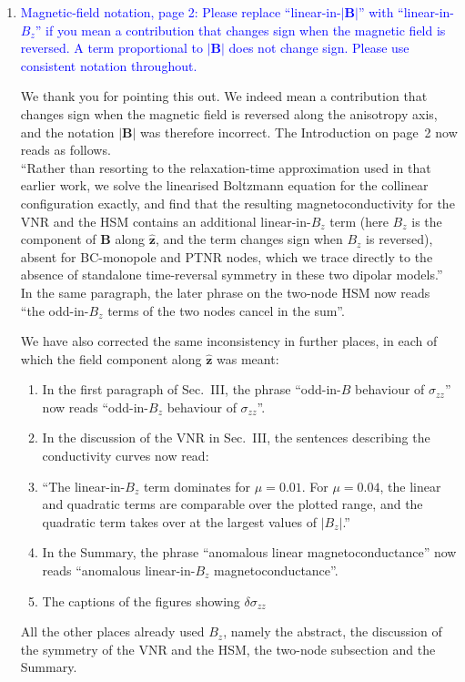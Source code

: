 \documentclass[aps,prb,onecolumn,nofootinbib,citeautoscript,10pt]{revtex4-2}
\DeclareRobustCommand{\bs}[1]{\bm{#1}}
\begin{document}
\begin{enumerate}

\item \textcolor{blue}{Magnetic-field notation, page 2: Please replace ``linear-in-$|\bs B|$'' with ``linear-in-$B_z$'' if you mean a contribution that changes sign when the magnetic field is reversed. A term proportional to $|\bs B|$ does not change sign. Please use consistent notation throughout.}

We thank you for pointing this out. We indeed mean a contribution that changes sign when the magnetic field is reversed along the anisotropy axis, and the notation $|\bs B|$ was therefore incorrect. The Introduction on page~2 now reads as follows.
\\``Rather than resorting to the relaxation-time approximation used in that earlier work, we solve the linearised Boltzmann equation for the collinear configuration exactly, and find that the resulting magnetoconductivity for the VNR and the HSM contains an additional linear-in-$B_z$ term (here $B_z$ is the component of $\bs B$ along $\hat{\bs z}$, and the term changes sign when $B_z$ is reversed), absent for BC-monopole and PTNR nodes, which we trace directly to the absence of standalone time-reversal symmetry in these two dipolar models.''
\\In the same paragraph, the later phrase on the two-node HSM now reads ``the odd-in-$B_z$ terms of the two nodes cancel in the sum''.

We have also corrected the same inconsistency in further places, in each of which the field component along $\hat{\bs z}$ was meant:
\begin{enumerate}

\item In the first paragraph of Sec.~III, the phrase ``odd-in-$B$ behaviour of $\sigma_{zz}$'' now reads ``odd-in-$B_z$ behaviour of $\sigma_{zz}$''.
\item In the discussion of the VNR in Sec.~III, the sentences describing the conductivity curves now read:
\item ``The linear-in-$B_z$ term dominates for $\mu=0.01$. For $\mu=0.04$, the linear and quadratic terms are comparable over the plotted range, and the quadratic term takes over at the largest values of $|B_z|$.''
\item In the Summary, the phrase ``anomalous linear magnetoconductance'' now reads ``anomalous linear-in-$B_z$ magnetoconductance''.
\item The captions of the figures showing $\delta\sigma_{zz}$
\end{enumerate}
All the other places already used $B_z$, namely the abstract, the discussion of the symmetry of the VNR and the HSM, the two-node subsection and the Summary.


\end{enumerate}
\end{document}
